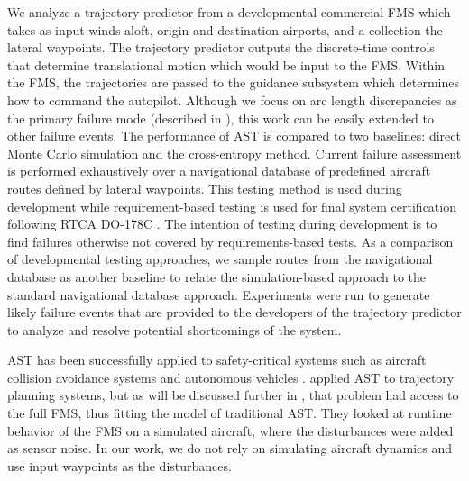 We analyze a trajectory predictor from a developmental commercial FMS which takes as input winds aloft, origin and destination airports, and a collection the lateral waypoints.
The trajectory predictor outputs the discrete-time controls that determine translational motion which would be input to the FMS.
Within the FMS, the trajectories are passed to the guidance subsystem which determines how to command the autopilot.
Although we focus on arc length discrepancies as the primary failure mode (described in ), this work can be easily extended to other failure events.
The performance of AST is compared to two baselines: direct Monte Carlo simulation and the cross-entropy method.
Current failure assessment is performed exhaustively over a navigational database of predefined aircraft routes defined by lateral waypoints.
This testing method is used during development while requirement-based testing is used for final system certification following RTCA DO-178C \cite{do178c}.
The intention of testing during development is to find failures otherwise not covered by requirements-based tests.
As a comparison of developmental testing approaches, we sample routes from the navigational database as another baseline to relate the simulation-based approach to the standard navigational database approach.
Experiments were run to generate likely failure events that are provided to the developers of the trajectory predictor to analyze and resolve potential shortcomings of the system.


AST has been successfully applied to safety-critical systems such as aircraft collision avoidance systems  \cite{ast_acasx,lee2018differential} and autonomous vehicles \cite{ast_av}. 
\citeauthor*{ast_traj_plan} applied AST to trajectory planning systems, but as will be discussed further in , that problem had access to the full FMS, thus fitting the model of traditional AST.
They looked at runtime behavior of the FMS on a simulated aircraft, where the disturbances were added as sensor noise.
In our work, we do not rely on simulating aircraft dynamics and use input waypoints as the disturbances.


